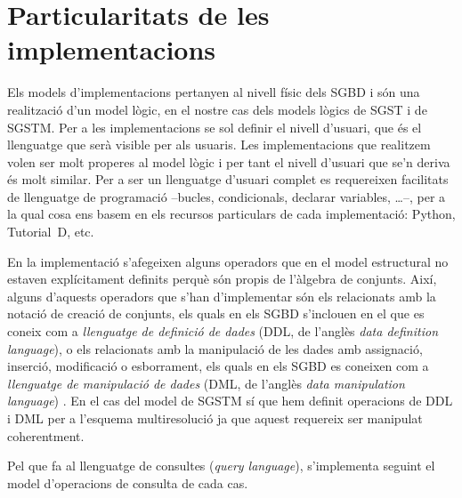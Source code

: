







\section{Particularitats de les implementacions}



Els models d'implementacions pertanyen al nivell físic dels \gls{SGBD}
i són una realització d'un model lògic, en el nostre cas dels models
lògics de \gls{SGST} i de \gls{SGSTM}. Per a les implementacions se
sol definir el nivell d'usuari, que és el llenguatge que serà visible
per als usuaris. Les implementacions que realitzem volen ser molt
properes al model lògic i per tant el nivell d'usuari que se'n deriva
és molt similar. Per a ser un llenguatge d'usuari complet es
requereixen facilitats de llenguatge de programació --bucles,
condicionals, declarar variables, \dots--, per a la qual cosa ens
basem en els recursos particulars de cada implementació: Python,
Tutorial~D, etc.




En la implementació s'afegeixen alguns operadors que en el model
estructural no estaven explícitament definits perquè són propis de
l'àlgebra de conjunts. Així, alguns d'aquests operadors que s'han
d'implementar són els relacionats amb la notació de creació de
conjunts, %
els quals en els \gls{SGBD} s'inclouen en el que es coneix com a
\emph{llenguatge de definició de dades} (DDL, de l'anglès \emph{data
  definition language}), o els relacionats amb la manipulació de les
dades amb assignació, inserció, modificació o esborrament, els quals
en els SGBD es coneixen com a \emph{llenguatge de manipulació de
  dades} (DML, de l'anglès \emph{data manipulation language}) .  En el
cas del model de \gls{SGSTM} sí que hem definit operacions de DDL i DML per
a l'esquema multiresolució ja que aquest requereix ser manipulat
coherentment.

Pel que fa al llenguatge de consultes (\emph{query language}),
s'implementa seguint el model d'operacions de consulta de cada cas.













